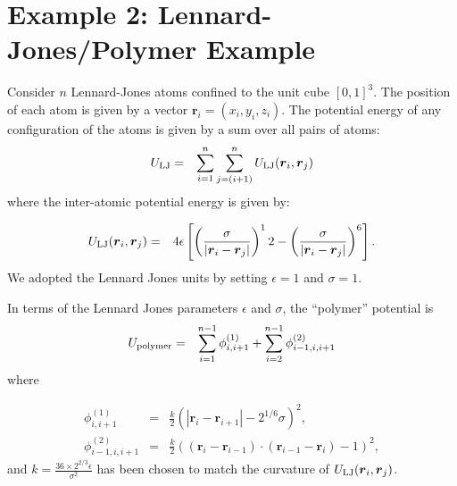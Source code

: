 \documentclass[entropy,article,submit,moreauthors,pdftex,10pt,a4paper]{Definitions/mdpi}
\begin{document}




\section{Example 2: Lennard-Jones/Polymer Example}

Consider $n$ Lennard-Jones atoms confined to the unit cube $[0, 1]^3$.
The position of each atom is given by a vector
$\boldsymbol{r}_i = (x_i, y_i, z_i)$.
The potential energy of any configuration of the atoms is given by
a sum over all pairs of atoms:
\begin{eqnarray}
U_{\rm LJ} &=& \sum_{i=1}^n\sum_{j=(i+1)}^n U_{\rm LJ}
(\boldsymbol{r}_i, \boldsymbol{r}_j)
\end{eqnarray}
where the inter-atomic potential energy is given by:

\begin{eqnarray}
U_{\rm LJ}(\boldsymbol{r}_i, \boldsymbol{r}_j)
&=& 4\epsilon
\left[
\left(\frac{\sigma}{|\boldsymbol{r}_i - \boldsymbol{r}_j|}\right)^12 -
\left(\frac{\sigma}{|\boldsymbol{r}_i - \boldsymbol{r}_j|}\right)^6
\right].
\end{eqnarray}
We adopted the Lennard Jones units by setting $\epsilon=1$ and $\sigma=1$.

In terms of the Lennard Jones parameters $\epsilon$ and $\sigma$, the
``polymer'' potential is
\begin{eqnarray}
U_{\rm polymer} &=&
\sum_{i=1}^{n-1} \phi^{(1)}_{i,i+1} + \sum_{i=2}^{n-1} \phi^{(2)}_{i-1, i, i+1}
\end{eqnarray}
where

\begin{eqnarray}
\phi^{(1)}_{i,i+1} &=& \frac{k}{2}\left(|\boldsymbol{r}_i - \boldsymbol{r}_{i+1}|- 2^{1/6}\sigma\right)^2,\\
\phi^{(2)}_{i-1, i, i+1} &=& \frac{k}{2}
\left((\boldsymbol{r}_i - \boldsymbol{r}_{i-1})\cdot(\boldsymbol{r}_{i-1} - \boldsymbol{r}_{i}) - 1\right)^2,
\end{eqnarray}
and $k=\frac{36 \times 2^{2/3}\epsilon}{\sigma^2}$ has been chosen to match
the curvature of $U_{\rm LJ}(\boldsymbol{r}_i, \boldsymbol{r}_j)$.
\end{document}
